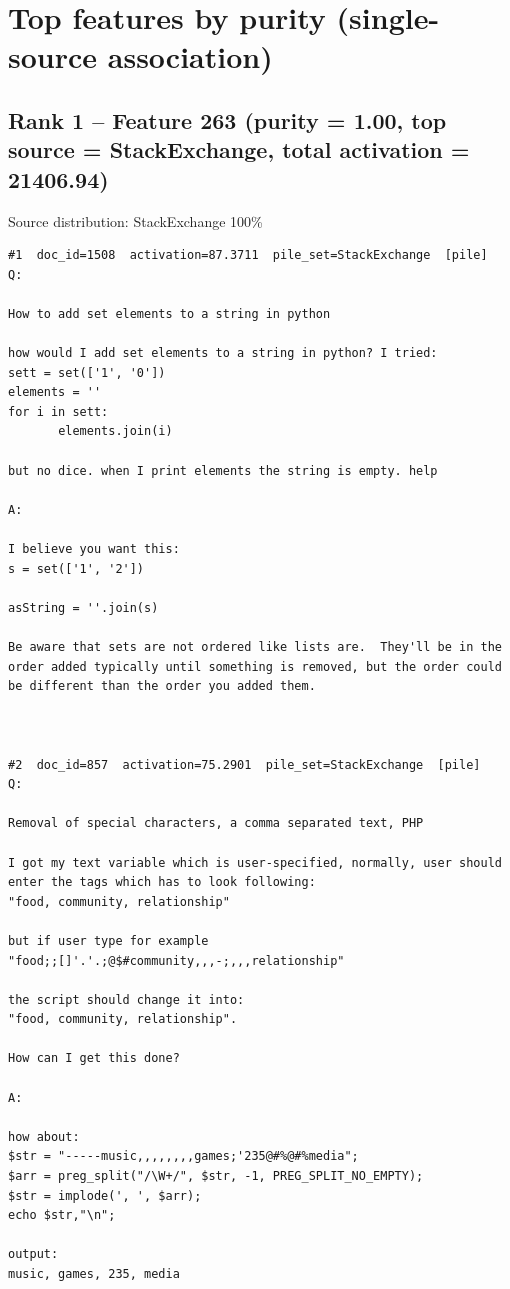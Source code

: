 \section*{Top features by purity (single-source association)}

\subsection*{Rank 1 -- Feature 263 (purity = 1.00, top source = StackExchange, total activation = 21406.94)}

Source distribution: StackExchange 100\%

\begin{verbatim}
#1  doc_id=1508  activation=87.3711  pile_set=StackExchange  [pile]
Q:

How to add set elements to a string in python

how would I add set elements to a string in python? I tried:
sett = set(['1', '0'])
elements = ''
for i in sett:
       elements.join(i)

but no dice. when I print elements the string is empty. help

A:

I believe you want this:
s = set(['1', '2'])

asString = ''.join(s)

Be aware that sets are not ordered like lists are.  They'll be in the order added typically until something is removed, but the order could be different than the order you added them.



#2  doc_id=857  activation=75.2901  pile_set=StackExchange  [pile]
Q:

Removal of special characters, a comma separated text, PHP

I got my text variable which is user-specified, normally, user should enter the tags which has to look following: 
"food, community, relationship"

but if user type for example 
"food;;[]'.'.;@$#community,,,-;,,,relationship"

the script should change it into: 
"food, community, relationship".

How can I get this done?

A:

how about:
$str = "-----music,,,,,,,,games;'235@#%@#%media";
$arr = preg_split("/\W+/", $str, -1, PREG_SPLIT_NO_EMPTY);
$str = implode(', ', $arr);
echo $str,"\n";

output:
music, games, 235, media


\end{verbatim}
